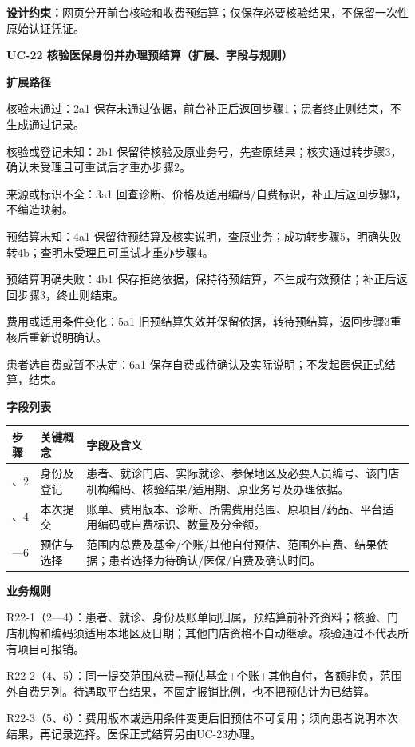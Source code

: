 \documentclass[UTF8,a4paper,zihao=-4,fontset=none]{ctexart}
\begin{document}
\noindent\textbf{设计约束：}网页分开前台核验和收费预结算；仅保存必要核验结果，不保留一次性原始认证凭证。\par
\endgroup
\clearpage
\begingroup\small\linespread{1.04}\selectfont
\noindent\textbf{UC-22 核验医保身份并办理预结算（扩展、字段与规则）}\par
\noindent\textbf{扩展路径}\par
\begin{description}\setlength{\itemsep}{0pt}\setlength{\parsep}{0pt}\setlength{\topsep}{2pt}
\item[2a] 核验未通过：2a1 保存未通过依据，前台补正后返回步骤1；患者终止则结束，不生成通过记录。
\item[2b] 核验或登记未知：2b1 保留待核验及原业务号，先查原结果；核实通过转步骤3，确认未受理且可重试后才重办步骤2。
\item[3a] 来源或标识不全：3a1 回查诊断、价格及适用编码/自费标识，补正后返回步骤3，不编造映射。
\item[4a] 预结算未知：4a1 保留待预结算及核实说明，查原业务；成功转步骤5，明确失败转4b；查明未受理且可重试才重办步骤4。
\item[4b] 预结算明确失败：4b1 保存拒绝依据，保持待预结算，不生成有效预估；补正后返回步骤3，终止则结束。
\item[5a] 费用或适用条件变化：5a1 旧预结算失效并保留依据，转待预结算，返回步骤3重核后重新说明确认。
\item[6a] 患者选自费或暂不决定：6a1 保存自费或待确认及实际说明；不发起医保正式结算，结束。
\end{description}
\noindent\textbf{字段列表}\par
{\setlength{\tabcolsep}{3pt}\renewcommand{\arraystretch}{1.04}
\noindent\begin{tabular}{@{}>{\raggedright\arraybackslash}p{1.2cm}>{\raggedright\arraybackslash}p{2.2cm}>{\raggedright\arraybackslash}p{12.3cm}@{}}
\toprule
步骤 & 关键概念 & 字段及含义 \\ \midrule
1、2 & 身份及登记 & 患者、就诊门店、实际就诊、参保地区及必要人员编号、该门店机构编码、核验结果/适用期、原业务号及办理依据。 \\
3、4 & 本次提交 & 账单、费用版本、诊断、所需费用范围、原项目/药品、平台适用编码或自费标识、数量及分金额。 \\
4—6 & 预估与选择 & 范围内总费及基金/个账/其他自付预估、范围外自费、结果依据；患者选择为待确认/医保/自费及确认时间。 \\
\bottomrule
\end{tabular}\par}
\smallskip
\noindent\textbf{业务规则}\par
\noindent R22-1（2—4）：患者、就诊、身份及账单同归属，预结算前补齐资料；核验、门店机构和编码须适用本地区及日期；其他门店资格不自动继承。核验通过不代表所有项目可报销。\par
\noindent R22-2（4、5）：同一提交范围总费=预估基金+个账+其他自付，各额非负，范围外自费另列。待遇取平台结果，不固定报销比例，也不把预估计为已结算。\par
\noindent R22-3（5、6）：费用版本或适用条件变更后旧预估不可复用；须向患者说明本次结果，再记录选择。医保正式结算另由UC-23办理。\par
\endgroup
\clearpage
\end{document}
